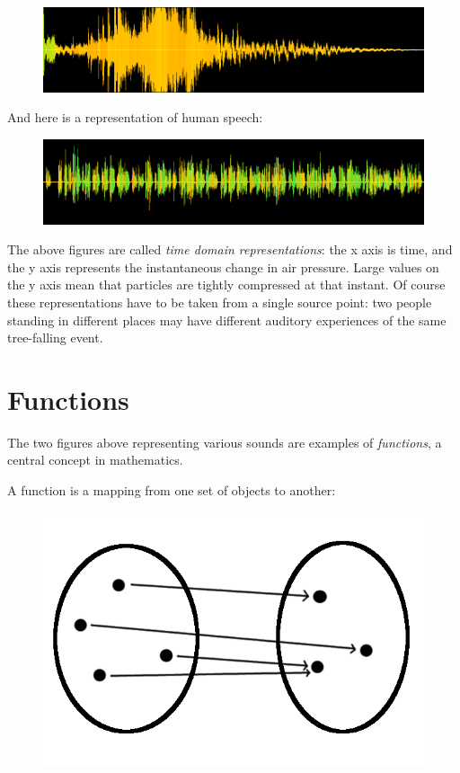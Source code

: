\documentclass[UTF8]{book}
\begin{document}
\begin{CJK}{UTF8}{gbsn}
\begin{figure}[H]
\centering
\includegraphics[width=0.8\linewidth]{tree_falling_soundwave}
\end{figure}

And here is a representation of human speech:

\begin{figure}[H]
\centering
\includegraphics[width=0.8\linewidth]{shakespeare_speech}
\end{figure}

The above figures are called \emph{time domain representations}: the x axis is time, and the y axis represents the instantaneous change in air pressure. Large values on the y axis mean that particles are tightly compressed at that instant. Of course these representations have to be taken from a single source point: two people standing in different places may have different auditory experiences of the same tree-falling event.

\section{Functions}

The two figures above representing various sounds are examples of \emph{functions}, a central concept in mathematics.

A function is a mapping from one set of objects to another:

\begin{figure}[H]
\centering
\includegraphics[width=0.8\linewidth]{function_basic}
\end{figure}


\end{CJK}
\end{document}
